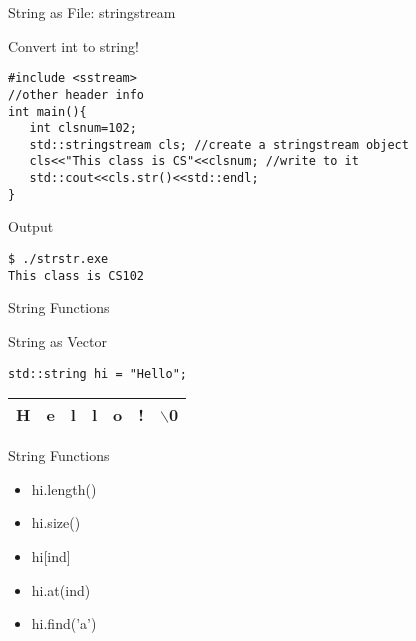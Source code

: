 \documentclass[xcolor={dvipsnames}]{beamer}
\begin{document}
\begin{frame}[fragile]{String as File: stringstream}
\begin{block}{Convert int to string!}
\begin{verbatim}
#include <sstream>
//other header info
int main(){
   int clsnum=102;
   std::stringstream cls; //create a stringstream object
   cls<<"This class is CS"<<clsnum; //write to it
   std::cout<<cls.str()<<std::endl;
}
\end{verbatim}
\end{block}

\begin{block}{Output}
\begin{verbatim}
$ ./strstr.exe
This class is CS102
\end{verbatim}
\end{block}
\end{frame}

\begin{frame}[fragile]{String Functions}
\begin{block}{String as Vector}
\begin{verbatim}
std::string hi = "Hello";
\end{verbatim}
\begin{table}
	\Huge
	\begin{tabular}{|c|c|c|c|c|c|c|}
	\hline
	H & e & l & l & o & ! & $\backslash$0\\
	\hline
	\end{tabular}
\end{table}
\end{block}
\begin{block}{String Functions}
	\begin{itemize}
		\item hi.length()
		\item hi.size()
		\item hi[ind]
		\item hi.at(ind)
		\item hi.find('a')
	\end{itemize}
\end{block}
\end{frame}
\end{document}

